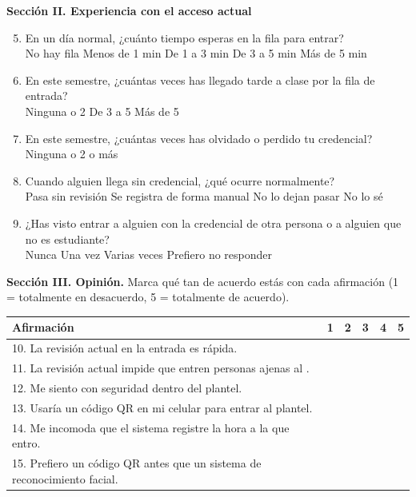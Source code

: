 \noindent\textbf{Sección II. Experiencia con el acceso actual}
\begin{enumerate}\setcounter{enumi}{4}
	\item En un día normal, ¿cuánto tiempo esperas en la fila para entrar?\\
	      \op No hay fila \quad \op Menos de 1 min \quad \op De 1 a 3 min
	      \quad \op De 3 a 5 min \quad \op Más de 5 min
	\item En este semestre, ¿cuántas veces has llegado tarde a clase por la fila
	      de entrada?\\
	      \op Ninguna \quad {} o 2 \quad \op De 3 a 5 \quad \op Más de 5
	\item En este semestre, ¿cuántas veces has olvidado o perdido tu credencial?\\
	      \op Ninguna \quad {} o 2 \quad {} o más
	\item Cuando alguien llega sin credencial, ¿qué ocurre normalmente?\\
	      \op Pasa sin revisión \quad \op Se registra de forma manual
	      \quad \op No lo dejan pasar \quad \op No lo sé
	\item ¿Has visto entrar a alguien con la credencial de otra persona o a
	      alguien que no es estudiante?\\
	      \op Nunca \quad \op Una vez \quad \op Varias veces
	      \quad \op Prefiero no responder
\end{enumerate}

\noindent\textbf{Sección III. Opinión.} Marca qué tan de acuerdo estás con cada
afirmación (1 = totalmente en desacuerdo, 5 = totalmente de acuerdo).

\medskip
\noindent
\begin{tabular}{p{}ccccc}
	\toprule
	Afirmación                                                               & 1   & 2   & 3   & 4   & 5   \\
	\midrule
	10. La revisión actual en la entrada es rápida.                          & \op & \op & \op & \op & \op \\
	11. La revisión actual impide que entren personas ajenas al \tescha{}.      & \op & \op & \op & \op & \op \\
	12. Me siento con seguridad dentro del plantel.                          & \op & \op & \op & \op & \op \\
	13. Usaría un código QR en mi celular para entrar al plantel.            & \op & \op & \op & \op & \op \\
	14. Me incomoda que el sistema registre la hora a la que entro.          & \op & \op & \op & \op & \op \\
	15. Prefiero un código QR antes que un sistema de reconocimiento facial. & \op & \op & \op & \op & \op \\
	\bottomrule
\end{tabular}

